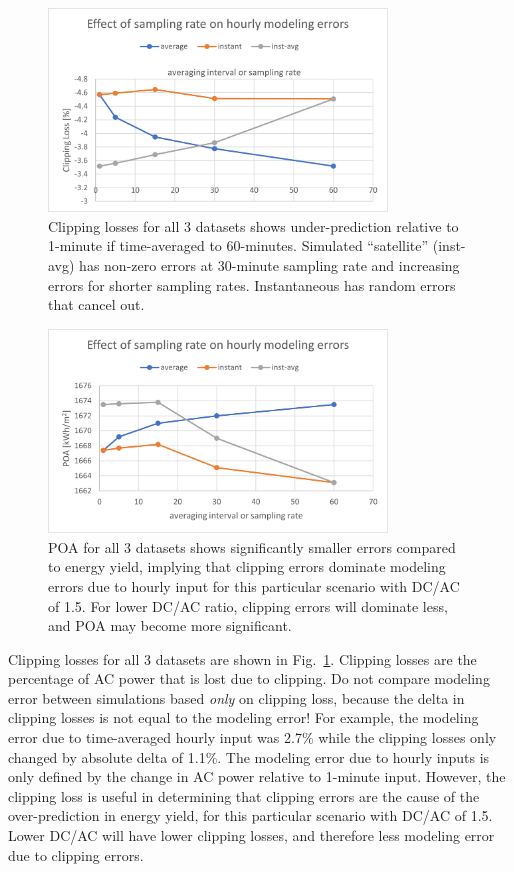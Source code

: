 \documentclass[conference]{IEEEtran}
\begin{document}
\begin{figure}[htbp]
\centerline{\includegraphics[width=9cm]{NIST_clipping_loss.png}}
\caption{Clipping losses for all 3 datasets shows under-prediction relative to 1-minute if time-averaged to 60-minutes. Simulated ``satellite'' (inst-avg) has non-zero errors at 30-minute sampling rate and increasing errors for shorter sampling rates. Instantaneous has random errors that cancel out.}
\label{fig:NIST-clipping-loss}
\end{figure}

\begin{figure}[htbp]
\centerline{\includegraphics[width=9cm]{NIST_POA.png}}
\caption{POA for all 3 datasets shows significantly smaller errors compared to energy yield, implying that clipping errors dominate modeling errors due to hourly input for this particular scenario with DC/AC of 1.5. For lower DC/AC ratio, clipping errors will dominate less, and POA may become more significant.}
\label{fig:NIST-POA}
\end{figure}

Clipping losses for all 3 datasets are shown in Fig.~\ref{fig:NIST-clipping-loss}. Clipping losses are the percentage of AC power that is lost due to clipping. Do not compare modeling error between simulations based \emph{only} on clipping loss, because the delta in clipping losses is not equal to the modeling error! For example, the modeling error due to time-averaged hourly input was 2.7\% while the clipping losses only changed by absolute delta of 1.1\%. The modeling error due to hourly inputs is only defined by the change in AC power relative to 1-minute input. However, the clipping loss is useful in determining that clipping errors are the cause of the over-prediction in energy yield, for this particular scenario with DC/AC of 1.5. Lower DC/AC will have lower clipping losses, and therefore less modeling error due to clipping errors.
\end{document}
